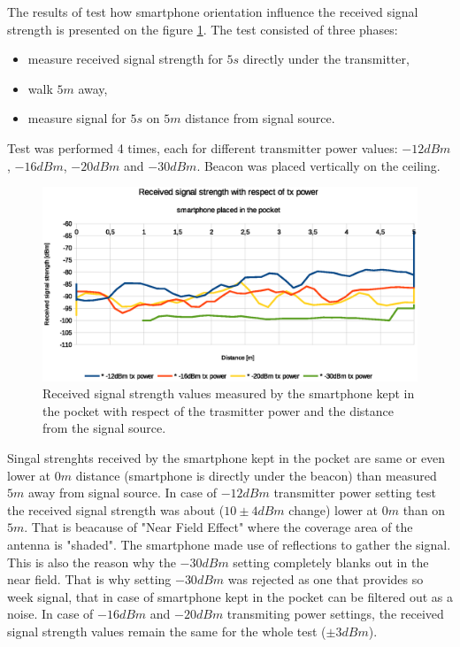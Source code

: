 \documentclass[../main.tex]{subfiles}
\begin{document}
The results of test how smartphone orientation influence the received signal strength is presented on the figure \ref{fig:tests_case2_smartphone_in_pocket_tx_power}. The test consisted of three phases:
\begin{itemize}
	\item measure received signal strength for $5 s$ directly under the transmitter,
	\item walk $5 m$ away,
	\item measure signal for $5 s$ on $5 m$ distance from signal source.
\end{itemize}

 Test was performed 4 times, each for different transmitter power values: $-12dBm$, $-16dBm$, $-20dBm$ and $-30dBm$. Beacon was placed vertically on the ceiling.

\begin{figure}[!htbp]
\includegraphics[width=\textwidth, keepaspectratio]{pictures/tests_case2_smartphone_in_pocket_tx_power}
\centering
\caption{Received signal strength values measured by the smartphone kept in the pocket with respect of the trasmitter power and the distance from the signal source.}
\label{fig:tests_case2_smartphone_in_pocket_tx_power}
\end{figure}

Singal strenghts received by the smartphone kept in the pocket are same or even lower at $0m$ distance (smartphone is directly under the beacon) than measured $5m$ away from signal source. In case of $-12dBm$ transmitter power setting test the received signal strength was about ($10\pm4 dBm$ change) lower at $0m$ than on $5m$. That is beacause of "Near Field Effect" where the coverage area of the antenna is "shaded". The smartphone made use of reflections to gather the signal. This is also the reason why the $-30dBm$ setting completely blanks out in the near field. That is why setting $-30dBm$ was rejected as one that provides so week signal, that in case of smartphone kept in the pocket can be filtered out as a noise. In case of $-16dBm$ and $-20dBm$ transmiting power settings, the received signal strength values remain the same for the whole test ($\pm 3dBm$).
\end{document}
